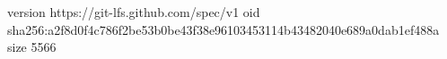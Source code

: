 version https://git-lfs.github.com/spec/v1
oid sha256:a2f8d0f4c786f2be53b0be43f38e96103453114b43482040e689a0dab1ef488a
size 5566
